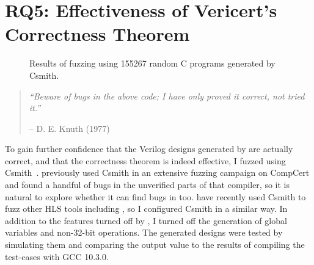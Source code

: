 \section{RQ5: Effectiveness of Vericert's Correctness Theorem}

\begin{figure}
  \centering

  \caption{Results of fuzzing \vericert{} using 155267 random C programs generated by Csmith.}\label{tab:fuzzing}
\end{figure}

\begin{quotation}
  \textit{\enquote{Beware of bugs in the above code; I have only proved it
      correct, not tried it.}}\par\hfill -- D. E. Knuth (1977)
\end{quotation}

\noindent To gain further confidence that the Verilog designs generated by
\vericert{} are actually correct, and that the correctness theorem is indeed
effective, I fuzzed \vericert{} using
Csmith~\cite{yang11_findin_under_bugs_c_compil}. \citeauthor{yang11_findin_under_bugs_c_compil}
previously used Csmith in an extensive fuzzing campaign on CompCert and found a
handful of bugs in the unverified parts of that compiler, so it is natural to
explore whether it can find bugs in \vericert{} too. \citet{herklotz21_esrhlst}
have recently used Csmith to fuzz other HLS tools including \legup{}, so I
configured Csmith in a similar way. In addition to the features turned off by
\citeauthor{herklotz21_esrhlst}, I turned off the generation of global variables
and non-32-bit operations. The generated designs were tested by simulating them
and comparing the output value to the results of compiling the test-cases with
GCC 10.3.0.

